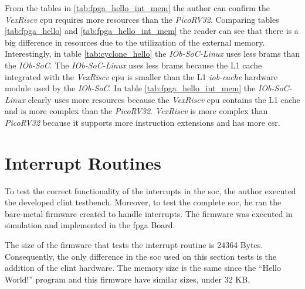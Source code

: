 From the tables in \ref{tab:fpga_hello_int_mem} the author can confirm the \textit{VexRiscv} \acrshort{cpu} requires more resources than the \textit{PicoRV32}. Comparing tables \ref{tab:fpga_hello} and \ref{tab:fpga_hello_int_mem} the reader can see that there is a big difference in resources due to the utilization of the external memory. Interestingly, in table \ref{tab:cyclone_hello} the \textit{IOb-SoC-Linux} uses less \acrshort{bram}s than the \textit{IOb-SoC}. The \textit{IOb-SoC-Linux} uses less \acrshort{bram}s because the L1 cache integrated with the \textit{VexRiscv} \acrshort{cpu} is smaller than the L1 \textit{iob-cache} hardware module used by the \textit{IOb-SoC}. In table \ref{tab:fpga_hello_int_mem} the \textit{IOb-SoC-Linux} clearly uses more resources because the \textit{VexRiscv} \acrshort{cpu} contains the L1 cache and is more complex than the \textit{PicoRV32}. \textit{VexRiscv} is more complex than \textit{PicoRV32} because it supports more instruction extensions and has more \acrlong{csr}.

\section{Interrupt Routines}
\label{section:interrupt_routine}
To test the correct functionality of the interrupts in the \acrshort{soc}, the author executed the developed \acrshort{clint} testbench. Moreover, to test the complete \acrshort{soc}, he ran the bare-metal firmware created to handle interrupts. The firmware was executed in simulation and implemented in the \acrshort{fpga} Board.

The size of the firmware that tests the interrupt routine is 24364 Bytes. Consequently, the only difference in the \acrshort{soc} used on this section tests is the addition of the \acrshort{clint} hardware. The memory size is the same since the \enquote{Hello World!} program and this firmware have similar sizes, under 32 KB.

